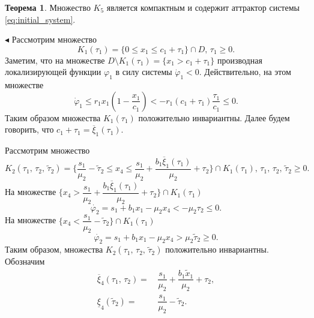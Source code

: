\documentclass[12pt,a4paper]{extarticle}
\renewenvironment{proof}{\noindent$\blacktriangleleft$}{}
\theoremstyle{definition}
\newtheorem{theorem}{Теорема}
\theoremstyle{definition}
\theoremstyle{definition}
\begin{document}
	\begin{theorem}
		Множество $K_5$ является компактным и содержит аттрактор системы \ref{eq:initial_system}.
	\end{theorem}
	\begin{proof}
		Рассмотрим множество
		\[K_1(\tau_1) = \{0 \le x_1 \le c_1+\tau_1\}\cap D,\, \tau_1\ge0.\]
		Заметим, что на множестве $D\setminus K_1(\tau_1) = \{x_1>c_1+\tau_1\}$ производная локализирующей функции $\varphi_1$ в силу системы $\dot{\varphi}_1 < 0$. Действительно, на этом множестве 
		\[\dot{\varphi}_1 \le r_1x_1\left(1-\dfrac{x_1}{c_1}\right) < -r_1(c_1+\tau_1)\dfrac{\tau_1}{c_1} \le 0.\]
		Таким образом множества $K_1(\tau_1)$ положительно инвариантны. Далее будем говорить, что $c_1+\tau_1=\overline{\xi}_1(\tau_1)$.
		
		Рассмотрим множество 
		\[K_2(\tau_1,\,\tau_2,\, \tilde{\tau}_2)=\{\dfrac{s_1}{\mu_2}-\tilde{\tau}_2 \le x_4 \le \dfrac{s_1}{\mu_2} + \dfrac{b_1\overline{\xi}_1(\tau_1)}{\mu_2} + \tau_2\}\cap K_1(\tau_1),\,\tau_1,\,\tau_2,\,\tilde{\tau}_2 \ge 0.\]   
		На множестве $\{x_4 > \dfrac{s_1}{\mu_2} + \dfrac{b_1\overline{\xi}_1(\tau_1)}{\mu_2} + \tau_2\}\cap K_1(\tau_1)$
		\[\dot{\varphi_2} = s_1 + b_1x_1 - \mu_2x_4 < - \mu_2\tau_2 \le 0.\]
		На множестве $\{x_4 < \dfrac{s_1}{\mu_2}-\tilde{\tau}_2\}\cap K_1(\tau_1)$
		\[\dot{\varphi_2} = s_1 + b_1x_1 - \mu_2x_4 > \mu_2\tilde{\tau}_2 \ge 0.\]
		Таким образом, множества $K_2(\tau_1,\,\tau_2,\,\tilde{\tau}_2)$ положительно инвариантны. Обозначим
		\begin{align*}
			\overline{\xi}_4(\tau_1,\,\tau_2) =&\, \dfrac{s_1}{\mu_2} + \dfrac{b_1\tilde{x}_1}{\mu_2} + \tau_2,\\
			\underline{\xi}_4(\tilde{\tau}_2) =&\, \dfrac{s_1}{\mu_2} - \tilde{\tau}_2.
		\end{align*}
		

\end{proof}
\end{document}
